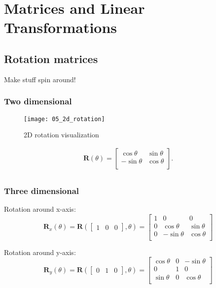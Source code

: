 \section{Matrices and Linear Transformations}

\subsection{Rotation matrices}\label{sec:rotation-matrices}

Make stuff spin around!

\subsubsection{Two dimensional}

\begin{figure}[H]
\centering
    \texttt{[image: 05\_2d\_rotation]}
\caption{2D rotation visualization}
\label{fig:2d-rotation-visualization}
\end{figure}

$$
\begin{matrix}
{\mathbf{R}(\theta) =
\begin{bmatrix}
{\cos\theta} & {\sin\theta} \\
{- \sin\theta} & {\cos\theta} \\
\end{bmatrix}.} \\
\end{matrix}
$$

\subsubsection{Three dimensional}

Rotation around x-axis: \\
$$
\mathbf{R}_{x}(\theta) = 
\mathbf{R}(
\begin{bmatrix}
1 & 0 & 0 
\end{bmatrix},
\theta) =
 \begin{bmatrix}
1 & 0 & 0 \\
0 & {\cos\theta} & {\sin\theta} \\
0 & {- \sin\theta} & {\cos\theta} \\
\end{bmatrix}
$$

Rotation around y-axis: \\
$$
\mathbf{R}_{y}(\theta) = 
\mathbf{R}(
\begin{bmatrix}
0 & 1 & 0 
\end{bmatrix},
\theta) = \begin{bmatrix}
{\cos\theta} & 0 & {- \sin\theta} \\
0 & 1 & 0 \\
{\sin\theta} & 0 & {\cos\theta} \\
\end{bmatrix}
$$

